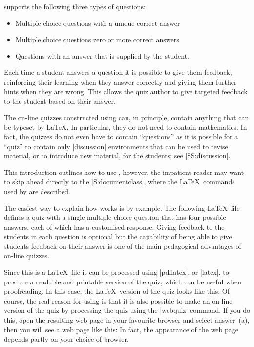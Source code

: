 \documentclass[svgnames]{article}
\begin{document}
      \WebQuiz supports the following three types of questions:
      \begin{itemize}
        \item Multiple choice questions with a unique correct answer
        \item Multiple choice questions zero or more correct answers
        \item Questions with an answer that is supplied by the student.
      \end{itemize}
      Each time a student answers a question it is possible to give them
      feedback, reinforcing their learning when they answer correctly and
      giving them further hints when they are wrong. This allows the
      quiz author to give targeted feedback to the student based on their
      answer.

      The on-line quizzes constructed using \WebQuiz can, in principle,
      contain anything that can be typeset by \LaTeX. In particular, they
      do not need to contain mathematics. In fact, the quizzes do not even
      have to contain ``questions'' as it is possible for a \WebQuiz
      ``quiz'' to contain only \LatexCode|discussion| environments that can
      be used to revise material, or to introduce new material, for the
      students; see \autoref{SS:discussion}.

      This introduction outlines how to use \WebQuiz, however, the
      impatient reader may want to skip ahead directly to the
      \autoref{S:documentclass}, where the \LaTeX\ commands used by
      \WebQuiz are described.

      The easiest way to explain how \WebQuiz works is by example. The
      following \LaTeX\ file defines a quiz with a single multiple choice
      question that has four possible answers, each of which has a
      customised response. Giving feedback to the students in each
      question is optional but the capability of being able to give
      students feedback on their answer is one of the main pedagogical
      advantages of on-line quizzes.


      Since this is a \LaTeX\ file it can be processed using
      \BashCode|pdflatex|, or \BashCode|latex|, to produce a readable and
      printable version of the quiz, which can be useful when
      proofreading. In this case, the \LaTeX\ version of the quiz looks
      like this:
      Of course, the real reason for using \WebQuiz is that it is also
      possible to make an on-line version of the quiz by processing the
      quiz using the \BashCode|webquiz| command. If you do this, open
      the resulting web page in your favourite browser and select answer~(a),
      then you will see a web page like this:
      In fact, the appearance of the web page depends partly on your
      choice of browser.
\end{document}

